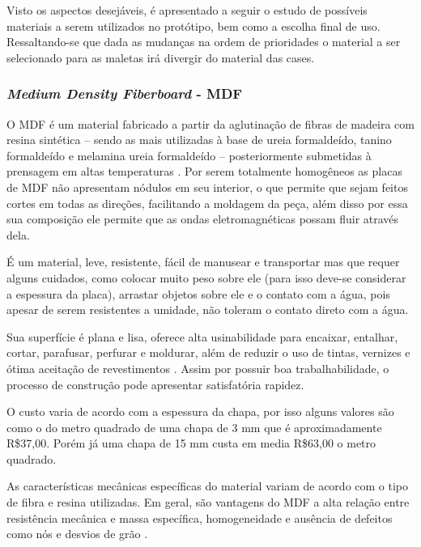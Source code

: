 \par Visto os aspectos desejáveis, é apresentado a seguir o estudo de possíveis materiais a serem utilizados no protótipo, bem como a escolha final de uso. Ressaltando-se que dada as mudanças na ordem de prioridades o material a ser selecionado para as maletas irá divergir do material das cases.


\subsubsection{\textit{Medium Density Fiberboard} - MDF}
     \par O MDF é um material fabricado a partir da aglutinação de fibras de madeira com resina sintética – sendo as mais utilizadas à base de ureia formaldeído, tanino formaldeído e melamina ureia formaldeído –  posteriormente submetidas à prensagem em altas temperaturas  \cite{gomes}. Por serem totalmente homogêneos as placas de MDF não apresentam nódulos em seu interior, o que permite que sejam feitos cortes em todas as direções, facilitando a moldagem da peça, além disso por essa sua composição ele permite que as ondas eletromagnéticas possam fluir através dela. 
     
     \par É um material, leve, resistente, fácil de manusear e transportar mas que requer alguns cuidados, como colocar muito peso sobre ele (para isso deve-se considerar a espessura da placa), arrastar objetos sobre ele e o contato com a água, pois apesar de serem resistentes a umidade, não toleram o contato direto com a água. \cite{mdf_site01}
     
    \par Sua superfície é plana e lisa, oferece alta usinabilidade para encaixar, entalhar, cortar, parafusar, perfurar e moldurar, além de reduzir o uso de tintas, vernizes e ótima aceitação de revestimentos \cite{CAMPOS}. Assim por possuir boa trabalhabilidade, o processo de construção pode apresentar satisfatória rapidez. \cite{eleoterio2000propriedades}
    
    \par O custo varia de acordo com a espessura da chapa, por isso alguns valores são como o do metro quadrado de uma chapa de 3 mm que é aproximadamente R\$37,00. Porém já uma chapa de 15 mm custa em media R\$63,00 o metro quadrado. \cite{mdf_site02}
    
    \par As características mecânicas específicas do material variam de acordo com o tipo de fibra e resina utilizadas. Em geral, são vantagens do MDF a alta relação entre resistência mecânica e massa específica, homogeneidade e ausência de defeitos como nós e desvios de grão \cite{eleoterio2000propriedades}. 
    

